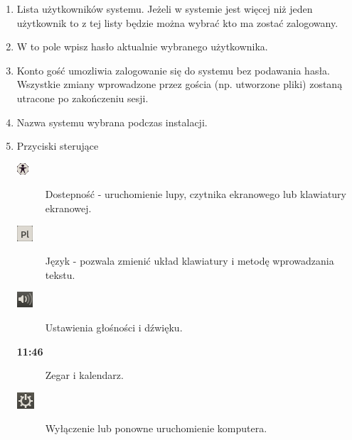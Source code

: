 \begin{enumerate}
\item Lista użytkowników systemu. Jeżeli w systemie jest więcej niż jeden użytkownik to z tej listy będzie można wybrać kto ma zostać zalogowany.
\item W to pole wpisz hasło aktualnie wybranego użytkownika.
\item Konto gość umozliwia zalogowanie się do systemu bez podawania hasła. Wszystkie zmiany wprowadzone przez gościa (np. utworzone pliki) zostaną utracone po zakończeniu sesji.
\item Nazwa systemu wybrana podczas instalacji.
\item Przyciski sterujące
\begin{description}
\item[\includegraphics{images/ikony_dostempnosc2.png}]Dostepność - uruchomienie lupy, czytnika ekranowego lub klawiatury ekranowej.
\item[\includegraphics{images/ikony_jezyk.png}]Język - pozwala zmienić układ klawiatury i metodę wprowadzania tekstu.
\item[\includegraphics{images/ikony_dzwiek.png}]Ustawienia głośności i dźwięku.
\item[\textbf{11:46}] Zegar i kalendarz.
\item[\includegraphics{images/ikony_zasilanie.png}]Wyłączenie lub ponowne uruchomienie komputera.
\end{description}
\end{enumerate}
\clearpage